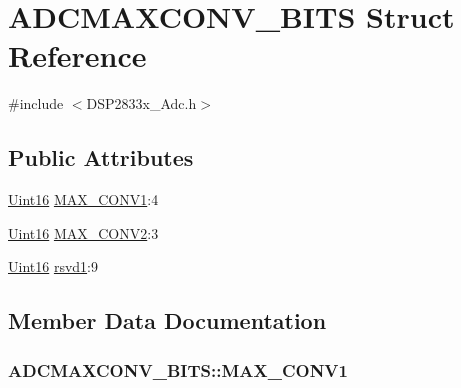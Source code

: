 \hypertarget{struct_a_d_c_m_a_x_c_o_n_v___b_i_t_s}{}\section{A\+D\+C\+M\+A\+X\+C\+O\+N\+V\+\_\+\+B\+I\+T\+S Struct Reference}
\label{struct_a_d_c_m_a_x_c_o_n_v___b_i_t_s}


{\ttfamily \#include $<$D\+S\+P2833x\+\_\+\+Adc.\+h$>$}

\subsection*{Public Attributes}
\begin{DoxyCompactItemize}
\item 
\hyperlink{_d_s_p2833x___device_8h_a59a9f6be4562c327cbfb4f7e8e18f08b}{Uint16} \hyperlink{struct_a_d_c_m_a_x_c_o_n_v___b_i_t_s_adc1acdca36b3cc5daf9e6ab2c7da83aa}{M\+A\+X\+\_\+\+C\+O\+N\+V1}\+:4
\item 
\hyperlink{_d_s_p2833x___device_8h_a59a9f6be4562c327cbfb4f7e8e18f08b}{Uint16} \hyperlink{struct_a_d_c_m_a_x_c_o_n_v___b_i_t_s_a2165132365d31614881684035d3ffca0}{M\+A\+X\+\_\+\+C\+O\+N\+V2}\+:3
\item 
\hyperlink{_d_s_p2833x___device_8h_a59a9f6be4562c327cbfb4f7e8e18f08b}{Uint16} \hyperlink{struct_a_d_c_m_a_x_c_o_n_v___b_i_t_s_a15d220a23e0b7f7fa89b06c99a924e92}{rsvd1}\+:9
\end{DoxyCompactItemize}


\subsection{Member Data Documentation}
\hypertarget{struct_a_d_c_m_a_x_c_o_n_v___b_i_t_s_adc1acdca36b3cc5daf9e6ab2c7da83aa}{}
\subsubsection[{M\+A\+X\+\_\+\+C\+O\+N\+V1}]{ A\+D\+C\+M\+A\+X\+C\+O\+N\+V\+\_\+\+B\+I\+T\+S\+::\+M\+A\+X\+\_\+\+C\+O\+N\+V1}\label{struct_a_d_c_m_a_x_c_o_n_v___b_i_t_s_adc1acdca36b3cc5daf9e6ab2c7da83aa}
\hypertarget{struct_a_d_c_m_a_x_c_o_n_v___b_i_t_s_a2165132365d31614881684035d3ffca0}{}
